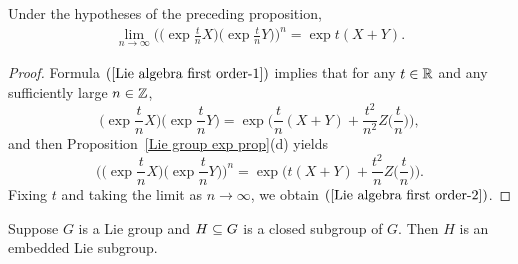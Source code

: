 \begin{corollary}
Under the hypotheses of the preceding proposition,
\begin{align}\label{Lie algebra first order-2}
\lim_{n\to\infty}\Big(\Big(\exp\frac{t}{n}X\Big)\Big(\exp\frac{t}{n}Y\Big)\Big)^n=\exp t(X+Y).
\end{align}
\end{corollary}
\begin{proof}
Formula $(\ref{Lie algebra first order-1})$ implies that for any $t\in\mathbb{R}$ and any sufficiently large $n\in\mathbb{Z}$,
\[\Big(\exp\frac{t}{n}X\Big)\Big(\exp\frac{t}{n}Y\Big)=\exp\Big(\frac{t}{n}(X+Y)+\frac{t^2}{n^2}Z\Big(\frac{t}{n}\Big)\Big),\]
and then Proposition~\ref{Lie group exp prop}(d) yields
\[\Big(\Big(\exp\frac{t}{n}X\Big)\Big(\exp\frac{t}{n}Y\Big)\Big)^n=\exp\Big(t(X+Y)+\frac{t^2}{n}Z\Big(\frac{t}{n}\Big)\Big).\]
Fixing $t$ and taking the limit as $n\to\infty$, we obtain $(\ref{Lie algebra first order-2})$.
\end{proof}
\begin{theorem}\label{Lie closed subgroup}
Suppose $G$ is a Lie group and $H\subseteq G$ is a closed subgroup of $G$. Then $H$ is an embedded Lie subgroup.
\end{theorem}
